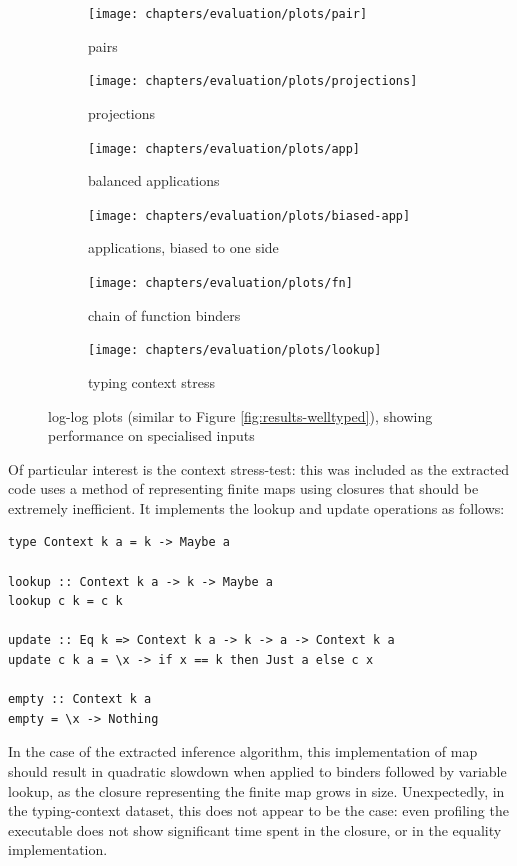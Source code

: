 \begin{figure}
\centering
\begin{subfigure}{.49\textwidth}
 \centering
 \texttt{[image: chapters/evaluation/plots/pair]}
 \caption{pairs}
\end{subfigure}
\begin{subfigure}{.49\textwidth}
 \centering
 \texttt{[image: chapters/evaluation/plots/projections]}
 \caption{projections}
\end{subfigure}
\begin{subfigure}{.49\textwidth}
 \centering
 \texttt{[image: chapters/evaluation/plots/app]}
 \caption{balanced applications}
\end{subfigure}
\begin{subfigure}{.49\textwidth}
 \centering
 \texttt{[image: chapters/evaluation/plots/biased-app]}
 \caption{applications, biased to one side}
\end{subfigure}
\begin{subfigure}{.49\textwidth}
 \centering
 \texttt{[image: chapters/evaluation/plots/fn]}
 \caption{chain of function binders}
\end{subfigure}
\begin{subfigure}{.49\textwidth}
 \centering
 \texttt{[image: chapters/evaluation/plots/lookup]}
 \caption{typing context stress}
\end{subfigure}
\caption{log-log plots (similar to Figure \ref{fig:results-welltyped}), showing performance on specialised inputs}
\label{fig:results-combined}
\end{figure}

Of particular interest is the context stress-test: this was included as the extracted code uses a method of representing finite maps using closures that should be extremely inefficient.
It implements the lookup and update operations as follows:

\begin{verbatim}
type Context k a = k -> Maybe a

lookup :: Context k a -> k -> Maybe a
lookup c k = c k

update :: Eq k => Context k a -> k -> a -> Context k a
update c k a = \x -> if x == k then Just a else c x

empty :: Context k a
empty = \x -> Nothing
\end{verbatim}

In the case of the extracted inference algorithm, this implementation of map should result in quadratic slowdown when applied to binders followed by variable lookup, as the closure representing the finite map grows in size.
Unexpectedly, in the typing-context dataset, this does not appear to be the case: even profiling the executable does not show significant time spent in the closure, or in the equality implementation.

